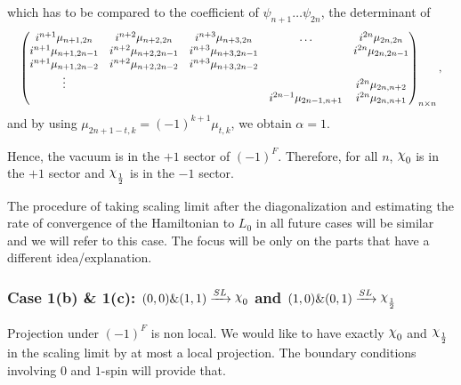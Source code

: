 \documentclass[twoside,11pt,titlepage]{amsart}
\renewcommand{\=}[1]{\stackrel{#1}{=}} %
\theoremstyle{definition}
\theoremstyle{remark}
\DeclareRobustCommand{\rchi}{{\mathpalette\irchi\relax}}
\newcommand{\irchi}[2]{\raisebox{\depth}{$#1\chi$}}
\begin{document}
which has to be compared to the coefficient of $\psi_{n+1} \ldots \psi_{2n}$, the determinant of
\begin{gather*}
\scalebox{0.89}{$\begin{pmatrix}
         i^{n+1}\mu_{n+1,2n} & i^{n+2} \mu_{n+2,2n} & i^{n+3} \mu_{n+3,2n} & \ldots & i^{2n}\mu_{2n,2n} \\
         i^{n+1}\mu_{n+1,2n-1} & i^{n+2} \mu_{n+2,2n-1} & i^{n+3} \mu_{n+3,2n-1} & & i^{2n}\mu_{2n,2n-1} \\
         i^{n+1}\mu_{n+1,2n-2} & i^{n+2} \mu_{n+2,2n-2} & i^{n+3} \mu_{n+3,2n-2} & &   \\
         \vdots &  &  & & i^{2n}\mu_{2n,n+2} \\
         &  & & i^{2n-1}\mu_{2n-1,n+1} &  i^{2n}\mu_{2n,n+1}
\end{pmatrix}_{n \times n},$}
\end{gather*}
and by using $\mu_{2n+1-t,k}=(-1)^{k+1}\mu_{t,k}$, we obtain $\alpha=1$. 

Hence, the vacuum is in the $+1$ sector of $(-1)^F$. Therefore, for all $n$, $\rchi_0$ is in the $+1$ sector and $\rchi_\frac{1}{2}$ is in the $-1$ sector.

The procedure of taking scaling limit after the diagonalization and estimating the rate of convergence of the Hamiltonian to $L_0$ in all future cases will be similar and we will refer to this case. The focus will be only on the parts that have a different idea/explanation.

\subsubsection*{\textbf{Case 1(b) \& 1(c): $(0,0) \& (1,1) \xrightarrow{SL} \rchi_0$ and $(1,0) \& (0,1) \xrightarrow{SL}\rchi_{\frac{1}{2}}$}}
\hfill \break

Projection under $(-1)^F$ is non local. We would like to have exactly $\rchi_0$ and $\rchi_{\frac{1}{2}}$ in the scaling limit by at most a local projection. The boundary conditions involving $0$ and $1$-spin will provide that.
\end{document}
